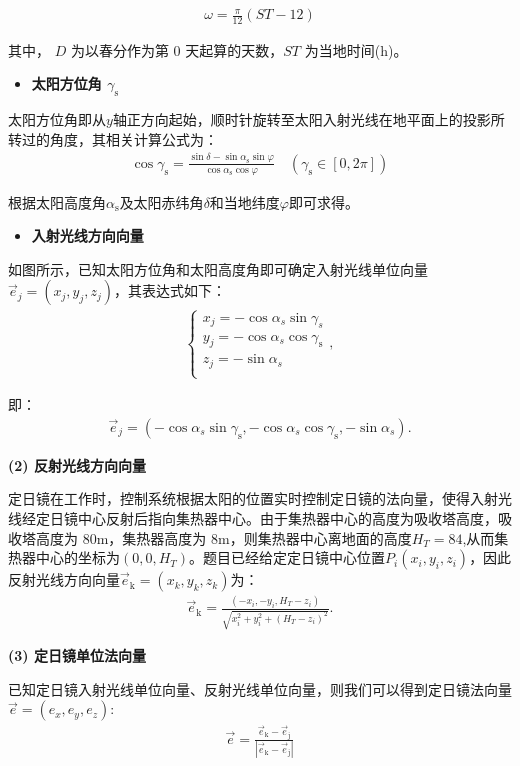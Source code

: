 \documentclass[../main.tex]{subfiles}
\begin{document}
\begin{align}    \label{1.6}
\omega = \frac{\pi}{12}(ST - 12)
\end{align}
\par 其中， $D$ 为以春分作为第 0 天起算的天数，$ST$ 为当地时间(h)。
\begin{itemize}
\item \textbf{太阳方位角 $ \gamma _{\text{s}}$}
\end{itemize}
\par 太阳方位角即从$y$轴正方向起始，顺时针旋转至太阳入射光线在地平面上的投影所转过的角度，其相关计算公式为：
\begin{align}    \label{1.7}
\cos \gamma _{\text{s}}=\frac{\sin \delta -\sin \alpha _{\text{s}}\sin \varphi}{\cos \alpha _{\text{s}}\cos \varphi}\quad \left( \gamma _{\text{s}}\in \left[ 0,2\pi \right] \right) 
\end{align}
\par 根据太阳高度角$\alpha_{\text{s}}$及太阳赤纬角$\delta$和当地纬度$\varphi$即可求得。

\begin{itemize}
\item \textbf{入射光线方向向量}
\end{itemize}
\par 如图所示，已知太阳方位角和太阳高度角即可确定入射光线单位向量$\vec{e}_j =(x_j, y_j, z_j)$，其表达式如下：
\begin{align}\label{1.8}
\begin{cases}
x_j=-\cos \alpha _s\sin \gamma _s\\
y_j=-\cos \alpha _s\cos \gamma _{\mathrm{s}}\\
z_j=-\sin \alpha _s\\
\end{cases},
\end{align}
\par 即：
\begin{align}\label{1.9}
\vec{e}_{j}=(-\cos \alpha _s\sin \gamma _{\mathrm{s}}, -\cos \alpha _s\cos \gamma _{\mathrm{s}}, -\sin \alpha _s).
\end{align}
\par \textbf{(2) 反射光线方向向量}
\par 定日镜在工作时，控制系统根据太阳的位置实时控制定日镜的法向量，使得入射光线经定日镜中心反射后指向集热器中心。由于集热器中心的高度为吸收塔高度，吸收塔高度为 80m，集热器高度为 8m，则集热器中心离地面的高度$H_T=84$,从而集热器中心的坐标为$(0,0,H_T)$。题目已经给定定日镜中心位置$P_{i}(x_i,y_i,z_i)$，因此反射光线方向向量$\vec{e}_{\text{k}}=(x_k,y_k,z_k)$为：
\begin{align}    \label{1.10}
\vec{e}_{\text{k}} = \frac{(-x_i, -y_i, H_T - z_i)}{\sqrt{x_i^2 + y_i^2 + (H_T - z_i)^2}}.
\end{align}
\par \textbf{(3) 定日镜单位法向量}
\par 已知定日镜入射光线单位向量、反射光线单位向量，则我们可以得到定日镜法向量$\vec{e}=(e_x,e_y,e_z)$:
\begin{align}    \label{1.11}
\vec{e} = \frac{\vec{e}_{\text{k}} - \vec{e}_{\text{j}}}{|\vec{e}_{\text{k}} - \vec{e}_{\text{j}}|}
\end{align}
\end{document}
